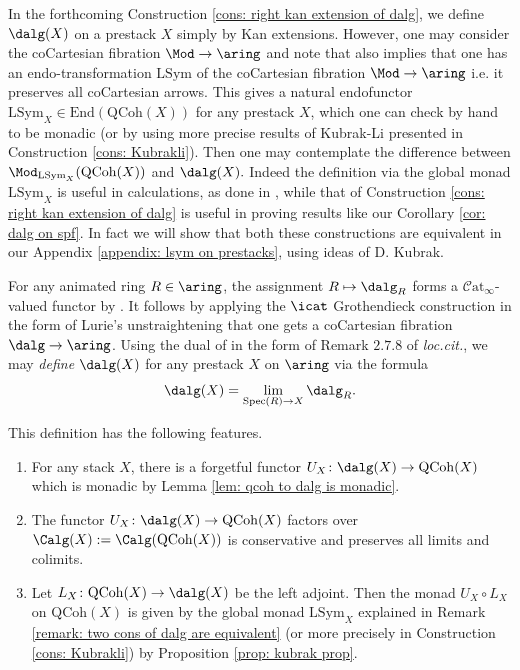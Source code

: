 \documentclass[10pt,reqno]{amsart}
\numberwithin{equation}{section}
\newcommand{\catinf}{\mathcal{C}\mathrm{at}_\infty}
\newcommand{\spec}{{\mathrm{Spec}}}
\newcommand{\End}{\mathrm{End}}
\newcommand{\Qcoh}{\mathrm{QCoh}}
\newcommand{\Sym}{\mathrm{Sym}}
\renewcommand{\L}{\mathrm{L}}
\begin{document}
\begin{remark}\label{remark: two cons of dalg are equivalent}
In the forthcoming Construction \ref{cons: right kan extension of dalg}, we define $\dalg(X)$ on a prestack $X$ simply by Kan extensions. 
However, one may consider the coCartesian fibration $\Mod\to \aring$ and note that  \cite[Remark 4.2.29]{Rak20} also implies that one has an endo-transformation $\L\Sym$ of the coCartesian fibration $\Mod\to \aring$ i.e. it preserves all coCartesian arrows. This gives a natural endofunctor $\L\Sym_X\in \End(\Qcoh(X))$ for any prestack $X$, which one can check by hand to be monadic (or by using more precise results of Kubrak-Li presented in Construction \ref{cons: Kubrakli}). Then one may contemplate the difference between $\Mod_{\L\Sym_X}(\Qcoh(X))$ and $\dalg(X).$ Indeed the definition via the global monad $\L\Sym_X$ is useful in calculations, as done in \cite[\S~2]{petrov_de_rham}, while that of Construction \ref{cons: right kan extension of dalg} is useful in proving results like our Corollary \ref{cor: dalg on spf}.
In fact we will show that both these constructions are equivalent in our Appendix \ref{appendix: lsym on prestacks}, using ideas of D. Kubrak.
\end{remark}


\begin{construction}\label{cons: right kan extension of dalg}
    For any animated ring $R\in \aring$, the assignment $R\mapsto \dalg_R$ forms a $\catinf$-valued functor by \cite[Remark 4.2.29]{Rak20}. It follows by applying the $\icat$ Grothendieck construction in the form of Lurie's unstraightening \cite[Theorem 3.2.0.1]{HTT} that one gets a coCartesian fibration $\dalg\to \aring$. Using the dual of \cite[Proposition 2.7.6.]{Lurie2011DAGVIII} in the form of Remark $2.7.8$ of \emph{loc.cit.}, we may \emph{define} $\dalg(X)$ for any prestack $X$ on $\aring$ via the formula
    $$\dalg(X)=\lim_{\spec(R)\to X} \dalg_R.$$

    This definition has the following features. 

    \begin{enumerate}
        \item For any stack $X$, there is a forgetful functor $U_X\colon \dalg(X)\to \Qcoh(X)$ which is monadic by Lemma \ref{lem: qcoh to dalg is monadic}.
        \item The functor $U_X\colon \dalg(X)\to \Qcoh(X)$ factors over $\Calg(X):=\Calg(\Qcoh(X))$ is conservative and preserves all limits and colimits.
        \item Let $L_X\colon \Qcoh(X)\to \dalg(X)$ be the left adjoint. Then the monad $U_X\circ L_X$ on $\Qcoh(X)$ is given by the global monad $\L\Sym_X$ explained in Remark \ref{remark: two cons of dalg are equivalent} (or more precisely in Construction \ref{cons: Kubrakli}) by Proposition \ref{prop: kubrak prop}.
    \end{enumerate}

\end{construction}  
\end{document}
